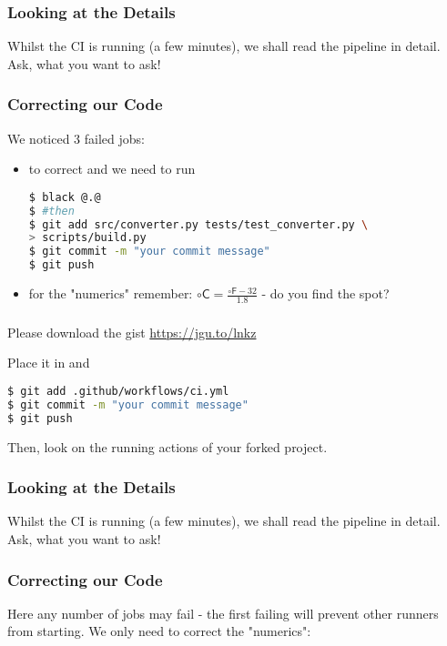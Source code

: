 \begin{frame}[fragile]
	\frametitle{Looking at the Details}
	\begin{task}
		{Whilst the CI is running (a few minutes), we shall read the pipeline in detail. Ask, what you want to ask!}
	\end{task}
\end{frame}

\begin{frame}[fragile]
	\frametitle{Correcting our Code}
	We noticed 3 failed jobs:
	\begin{itemize}[<+->]
		\item to correct  and  we need to run
		      \begin{lstlisting}[language=Bash, style=Shell]
$ black @.@
$ #then
$ git add src/converter.py tests/test_converter.py \
> scripts/build.py
$ git commit -m "your commit message"
$ git push
		      \end{lstlisting}
	     \item for the "numerics" remember: $\circ\mathsf{C} = \frac{\circ\mathsf{F} - 32}{1.8}$ - do you find the spot?
	\end{itemize}
\end{frame}


\begin{frame}[fragile]
	\frametitle{ }
	\begin{task}
		{Please download the gist \url{https://jgu.to/lnkz}}
	\end{task}
	Place it in  and
	\begin{lstlisting}[language=Bash, style=Shell]
$ git add .github/workflows/ci.yml
$ git commit -m "your commit message"
$ git push
	\end{lstlisting}
	Then, look on the running actions of your forked project.
\end{frame}

\begin{frame}[fragile]
	\frametitle{Looking at the Details}
	\begin{task}
		{Whilst the CI is running (a few minutes), we shall read the pipeline in detail. Ask, what you want to ask!}
	\end{task}
\end{frame}

\begin{frame}[fragile]
	\frametitle{Correcting our Code}
	Here any number of jobs may fail - the first failing will prevent other runners from starting. We only need to correct the "numerics":
	
\end{frame}